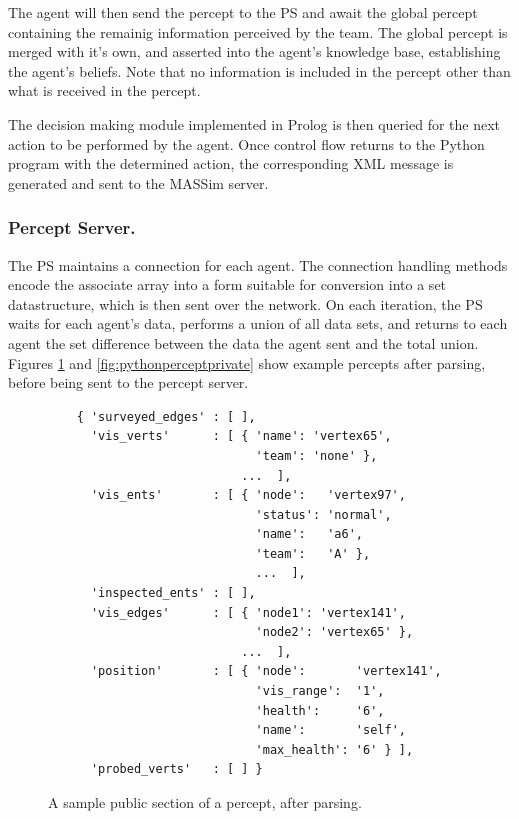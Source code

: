     The agent will then send the percept to the PS and await the global percept
    containing the remainig information perceived by the team. The global
    percept is merged with it's own, and asserted into the agent's knowledge
    base, establishing the agent's beliefs.  Note that no information is
    included in the percept other than what is received in the percept.

    The decision making module implemented in Prolog is then queried for the
    next action to be performed by the agent.  Once control flow returns to the
    Python program with the determined action, the corresponding XML message is
    generated and sent to the MASSim server. 

\subsubsection{Percept Server.}
    The PS maintains a connection for each agent.  The connection handling
    methods encode the associate array into a form suitable for conversion into
    a set datastructure, which is then sent over the network.  On each
    iteration, the PS waits for each agent's data, performs a union of all data
    sets, and returns to each agent the set difference between the data the
    agent sent and the total union.  Figures \ref{fig:pythonperceptpublic} and
    \ref{fig:pythonperceptprivate} show example percepts after parsing, before
    being sent to the percept server.

    \begin{figure}
    \centering
    \label{fig:pythonperceptpublic}
    \begin{small}
    \begin{verbatim}
    { 'surveyed_edges' : [ ], 
      'vis_verts'      : [ { 'name': 'vertex65',  
                             'team': 'none' }, 
                           ...  ],  
      'vis_ents'       : [ { 'node':   'vertex97',  
                             'status': 'normal', 
                             'name':   'a6',  
                             'team':   'A' }, 
                             ...  ],  
      'inspected_ents' : [ ],  
      'vis_edges'      : [ { 'node1': 'vertex141', 
                             'node2': 'vertex65' }, 
                           ...  ], 
      'position'       : [ { 'node':       'vertex141', 
                             'vis_range':  '1', 
                             'health':     '6', 
                             'name':       'self', 
                             'max_health': '6' } ], 
      'probed_verts'   : [ ] }
    \end{verbatim}
    \end{small}
    \caption{A sample public section of a percept, after parsing.}
    \end{figure}


